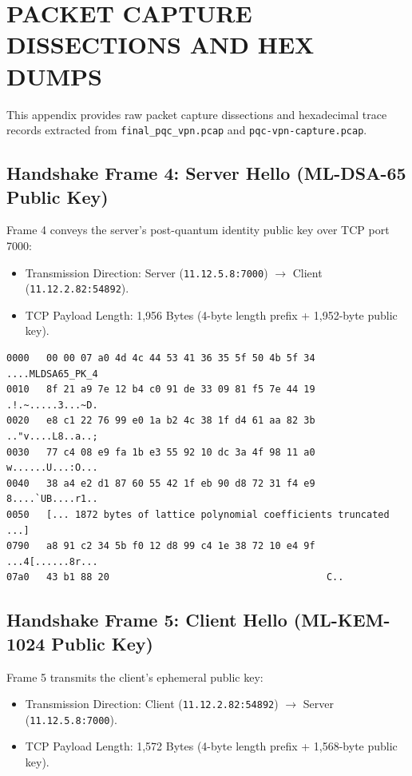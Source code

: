 
\chapter{PACKET CAPTURE DISSECTIONS AND HEX DUMPS}
\label{app:pcap_dissection}

This appendix provides raw packet capture dissections and hexadecimal trace records extracted from \texttt{final\_pqc\_vpn.pcap} and \texttt{pqc-vpn-capture.pcap}.

\section{Handshake Frame 4: Server Hello (ML-DSA-65 Public Key)}

Frame 4 conveys the server's post-quantum identity public key over TCP port 7000:
\begin{itemize}
    \item Transmission Direction: Server (\texttt{11.12.5.8:7000}) $\to$ Client (\texttt{11.12.2.82:54892}).
    \item TCP Payload Length: 1,956 Bytes (4-byte length prefix + 1,952-byte public key).
\end{itemize}

\begin{lstlisting}[basicstyle=\ttfamily\scriptsize, caption={Hex Dump Excerpt of Handshake Frame 4 (ML-DSA-65 Public Key).}]
0000   00 00 07 a0 4d 4c 44 53 41 36 35 5f 50 4b 5f 34  ....MLDSA65_PK_4
0010   8f 21 a9 7e 12 b4 c0 91 de 33 09 81 f5 7e 44 19  .!.~.....3...~D.
0020   e8 c1 22 76 99 e0 1a b2 4c 38 1f d4 61 aa 82 3b  .."v....L8..a..;
0030   77 c4 08 e9 fa 1b e3 55 92 10 dc 3a 4f 98 11 a0  w......U...:O...
0040   38 a4 e2 d1 87 60 55 42 1f eb 90 d8 72 31 f4 e9  8....`UB....r1..
0050   [... 1872 bytes of lattice polynomial coefficients truncated ...]
0790   a8 91 c2 34 5b f0 12 d8 99 c4 1e 38 72 10 e4 9f  ...4[......8r...
07a0   43 b1 88 20                                      C.. 
\end{lstlisting}

\section{Handshake Frame 5: Client Hello (ML-KEM-1024 Public Key)}

Frame 5 transmits the client's ephemeral public key:
\begin{itemize}
    \item Transmission Direction: Client (\texttt{11.12.2.82:54892}) $\to$ Server (\texttt{11.12.5.8:7000}).
    \item TCP Payload Length: 1,572 Bytes (4-byte length prefix + 1,568-byte public key).
\end{itemize}

